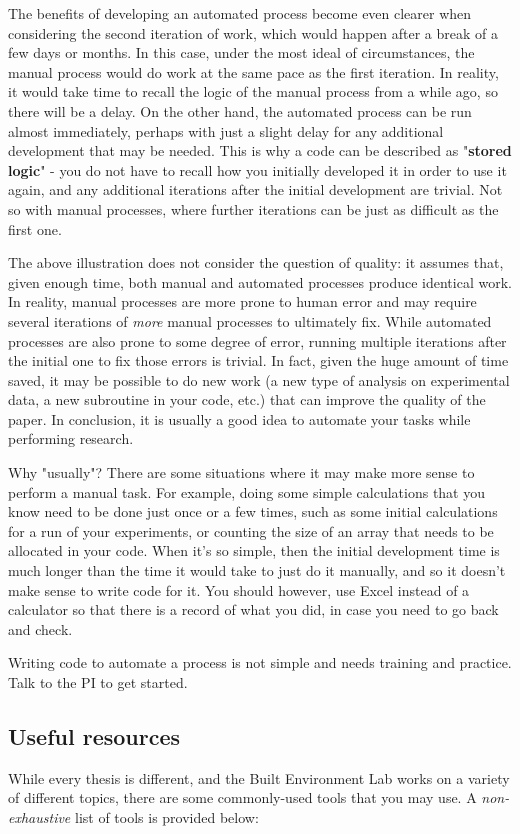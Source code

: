 \documentclass[12pt]{article}
\begin{document}
The benefits of developing an automated process become even clearer when considering the second iteration of work, which would happen after a break of a few days or months. In this case, under the most ideal of circumstances, the manual process would do work at the same pace as the first iteration. In reality, it would take time to recall the logic of the manual process from a while ago, so there will be a delay. On the other hand, the automated process can be run almost immediately, perhaps with just a slight delay for any additional development that may be needed. This is why a code can be described as "\textbf{stored logic}" - you do not have to recall how you initially developed it in order to use it again, and any additional iterations after the initial development are trivial. Not so with manual processes, where further iterations can be just as difficult as the first one. 

The above illustration does not consider the question of quality: it assumes that, given enough time, both manual and automated processes produce identical work. In reality, manual processes are more prone to human error and may require several iterations of \textit{more} manual processes to ultimately fix. While automated processes are also prone to some degree of error, running multiple iterations after the initial one to fix those errors is trivial. In fact, given the huge amount of time saved, it may be possible to do new work (a new type of analysis on experimental data, a new subroutine in your code, etc.) that can improve the quality of the paper. In conclusion, it is usually a good idea to automate your tasks while performing research.

Why "usually"? There are some situations where it may make more sense to perform a manual task. For example, doing some simple calculations that you know need to be done just once or a few times, such as some initial calculations for a run of your experiments, or counting the size of an array that needs to be allocated in your code. When it's so simple, then the initial development time is much longer than the time it would take to just do it manually, and so it doesn't make sense to write code for it. You should however, use Excel instead of a calculator so that there is a record of what you did, in case you need to go back and check. 

Writing code to automate a process is not simple and needs training and practice. Talk to the PI to get started. 

\subsection{Useful resources}
While every thesis is different, and the Built Environment Lab works on a variety of different topics, there are some commonly-used tools that you may use. A \textit{non-exhaustive} list of tools is provided below:
\end{document}
